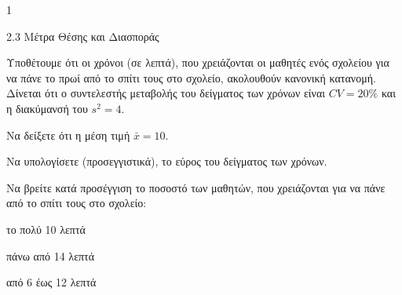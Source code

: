 \begin{ylh}{1}
    \item 2.3 Μέτρα Θέσης και Διασποράς
\end{ylh}
Υποθέτουμε ότι οι χρόνοι (σε λεπτά), που χρειάζονται οι μαθητές ενός σχολείου για να πάνε το πρωί από το σπίτι τους στο σχολείο, ακολουθούν κανονική κατανομή.
Δίνεται ότι ο συντελεστής μεταβολής του δείγματος των χρόνων είναι $CV = 20\%$ και η διακύμανσή του $s^2 = 4$.
\begin{alist}
\item Να δείξετε ότι η μέση τιμή $\bar{x} = 10$. 
\item Να υπολογίσετε (προσεγγιστικά), το εύρος του δείγματος των χρόνων. 
\item Να βρείτε κατά προσέγγιση το ποσοστό των μαθητών, που χρειάζονται για να πάνε από το σπίτι τους στο σχολείο:
    \begin{rlist}
        \item το πολύ 10 λεπτά
        \item πάνω από 14 λεπτά
        \item από 6 έως 12 λεπτά
    \end{rlist}
\end{alist}

